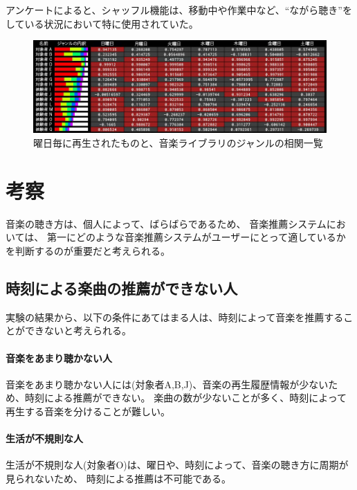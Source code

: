 \documentclass[a4paper, 11pt, onecolumn, report]{jsarticle}
\begin{document}
アンケートによると、シャッフル機能は、移動中や作業中など、``ながら聴き''をしている状況において特に使用されていた。



\begin{figure}
\begin{center}
\includegraphics[width = 14cm]{corTable.jpg}
\caption{曜日毎に再生されたものと、音楽ライブラリのジャンルの相関一覧}
\label{corTable}
\end{center}
\end{figure}


\section{考察}
音楽の聴き方は、個人によって、ばらばらであるため、
音楽推薦システムにおいては、
第一にどのような音楽推薦システムがユーザーにとって適しているかを判断するのが重要だと考えられる。

\subsection{時刻による楽曲の推薦ができない人}
実験の結果から、以下の条件にあてはまる人は、時刻によって音楽を推薦することができないと考えられる。
\paragraph{音楽をあまり聴かない人}
音楽をあまり聴かない人には(対象者A,B,J)、音楽の再生履歴情報が少ないため、時刻による推薦ができない。
楽曲の数が少ないことが多く、時刻によって再生する音楽を分けることが難しい。

\paragraph{生活が不規則な人}
生活が不規則な人(対象者O)は、曜日や、時刻によって、音楽の聴き方に周期が見られないため、
時刻による推薦は不可能である。
\end{document}
